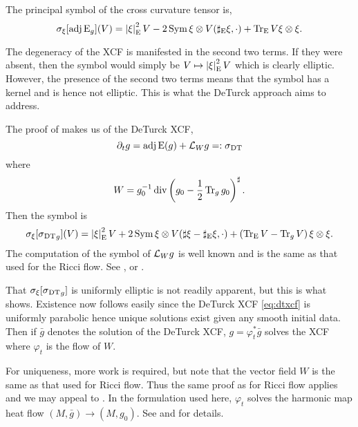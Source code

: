\documentclass[a4paper,12pt]{amsart}
\begin{document}
\begin{lemma}
\label{lem:xcf_symbol}
The principal symbol of the cross curvature tensor is,
\[
\sigma_{\xi} [\operatorname{adj}\operatorname{E}_g] (V) = \left\lvert{\xi}\right\rvert^2_{\operatorname{E}}V - 2 \operatorname{Sym} \xi \otimes V(\sharp_{\operatorname{E}}\xi, \cdot) + \operatorname{Tr}_{\operatorname{E}} V \xi \otimes \xi.
\]
\end{lemma}

The degeneracy of the XCF is manifested in the second two terms. If they were absent, then the symbol would simply be \(V \mapsto \left\lvert{\xi}\right\rvert^2_{\operatorname{E}} V\) which is clearly elliptic. However, the presence of the second two terms means that the symbol has a kernel and is hence not elliptic. This is what the DeTurck approach aims to address.

The proof of  makes us of the DeTurck XCF,
\begin{equation}
\label{eq:dtxcf}
\partial_t g = \operatorname{adj}\operatorname{E} (g) + \mathcal{L}_W g =: \operatorname{\operatorname{\sigma}_{\operatorname{DT}}}
\end{equation}
where
\[
W = g_0^{-1} \operatorname{div} \left(g_0 - \frac{1}{2}\operatorname{Tr}_g g_0\right)^{\sharp}.
\]
Then the symbol is
\begin{equation}
\label{eq:dtxcf_symbol}
\sigma_{\xi} [\operatorname{\operatorname{\sigma}_{\operatorname{DT}}}_g] (V) = \left\lvert{\xi}\right\rvert^2_{\operatorname{E}}V + 2 \operatorname{Sym} \xi \otimes V(\sharp \xi - \sharp_{\operatorname{E}}\xi, \cdot) + \left(\operatorname{Tr}_{\operatorname{E}} V - \operatorname{Tr}_g V\right) \xi \otimes \xi.
\end{equation}
The computation of the symbol of \(\mathcal{L}_W g\) is well known and is the same as that used for the Ricci flow. See \cite{MR2207496}, \cite[Sections 3.3, 3.4]{MR2061425} or \cite[Chapter 5]{MR2265040}.

That \(\sigma_{\xi}[\operatorname{\operatorname{\sigma}_{\operatorname{DT}}}_g]\) is uniformly elliptic is not readily apparent, but this is what \cite{MR2207496} shows. Existence now follows easily since the DeTurck XCF \eqref{eq:dtxcf} is uniformly parabolic hence unique solutions exist given any smooth initial data. Then if \(\bar{g}\) denotes the solution of the DeTurck XCF, \(g = \varphi_t^{\ast} \bar{g}\) solves the XCF where \(\varphi_t\) is the flow of \(W\).

For uniqueness, more work is required, but note that the vector field \(W\) is the same as that used for Ricci flow. Thus the same proof as for Ricci flow applies and we may appeal to \cite[Section 6]{MR1375255}. In the formulation used here, \(\varphi_t\) solves the harmonic map heat flow \((M, \bar{g}) \to (M, g_0)\). See \cite[Section 5.2]{MR2265040} and \cite[Sections 3.3, 3.4]{MR2061425} for details.
\end{document}

